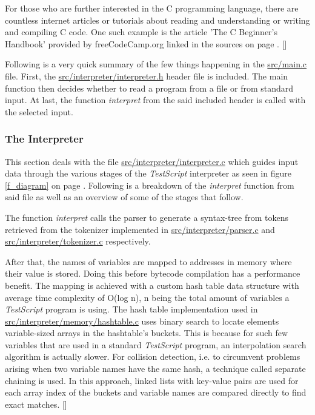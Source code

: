 \documentclass[12pt,a4paper]{article}
\newcommand{\hrc}[1]{\hyperref[#1]{#1}}
\newcommand{\name}{\emph{TestScript}}
\begin{document}
For those who are further interested in the C programming language, there are
countless internet articles or tutorials about reading and understanding or
writing and compiling C code. One such example is the article 'The C Beginner's
Handbook' provided by freeCodeCamp.org linked in the sources
on page \pageref{bibliography}.
[]

Following is a very quick summary of the few 
things happening in the \hrc{src/main.c} file.
First, the \hrc{src/interpreter/interpreter.h} header file is included. 
The main function then decides whether to
read a program from a file or from standard input. 
At last, the function \emph{interpret}
from the said included header is called with the selected input.

\subsubsection{The Interpreter}
This section deals with the file 
\hrc{src/interpreter/interpreter.c} which guides
input data through the various stages of the \name{} interpreter as 
seen in figure \ref{f_diagram} on page \pageref{f_diagram}.
Following is a breakdown of the \emph{interpret} function from said file
as well as an overview of some of the stages that follow.

The function \emph{interpret} calls the parser to generate a syntax-tree from tokens retrieved
from the tokenizer implemented in \hrc{src/interpreter/parser.c} and 
\hrc{src/interpreter/tokenizer.c} respectively.

After that, the names of variables are
mapped to addresses in memory where their value is stored. Doing this before
bytecode compilation has a performance benefit. 
The mapping is achieved with a custom hash table data structure with average time
complexity of O(log n), n being the total amount of variables a \name{} program is using.
The hash table implementation used in \hrc{src/interpreter/memory/hashtable.c}                   %
uses binary search to locate elements variable-sized arrays in the hashtable's buckets.
This is because for such few variables that are used in a standard \name{} program,
an interpolation search algorithm is actually slower.
For collision detection, i.e. to circumvent problems arising when two variable names have the
same hash, a technique called separate chaining is used. In this approach, linked lists with
key-value pairs are used for each array index of the buckets and variable names are compared directly
to find exact matches.
[]
\end{document}
